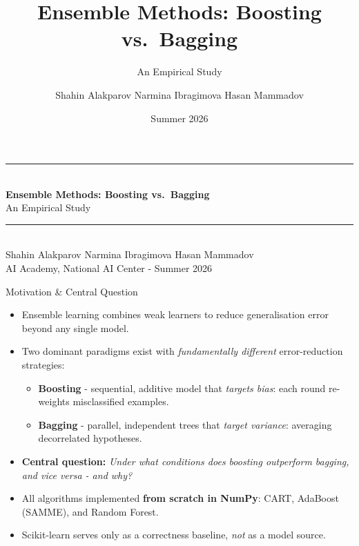 \documentclass[aspectratio=169,10pt]{beamer}
\title{\color{lectureblue}Ensemble Methods: Boosting vs.\ Bagging}
\subtitle{An Empirical Study}
\author{Shahin Alakparov \quad Narmina Ibragimova \quad Hasan Mammadov}
\institute{AI Academy, National AI Center}
\date{Summer 2026}
\begin{document}
\begin{frame}[plain]
  \vspace{1.2cm}
  \centering
  {\color{lectureblue}\rule{0.9\linewidth}{1.2pt}}\\[10pt]
  {\LARGE\bfseries\color{lectureblue} Ensemble Methods: Boosting vs.\ Bagging}\\[4pt]
  {\large An Empirical Study}\\[10pt]
  {\color{lectureblue}\rule{0.9\linewidth}{1.2pt}}\\[18pt]
  {\normalsize Shahin Alakparov \quad Narmina Ibragimova \quad Hasan Mammadov}\\[4pt]
  {\small AI Academy, National AI Center - Summer 2026}
\end{frame}

\begin{frame}{Motivation \& Central Question}
  \begin{itemize}
    \item Ensemble learning combines weak learners to reduce generalisation error beyond any single model.
    \item Two dominant paradigms exist with \emph{fundamentally different} error-reduction strategies:
      \begin{itemize}
        \item \textbf{Boosting} - sequential, additive model that \emph{targets bias}: each round re-weights misclassified examples.
        \item \textbf{Bagging} - parallel, independent trees that \emph{target variance}: averaging decorrelated hypotheses.
      \end{itemize}
    \item[] {\color{lectureblue}\textbf{Central question:}} \textit{Under what conditions does boosting outperform bagging, and vice versa - and \emph{why}?}
    \item All algorithms implemented \textbf{from scratch in NumPy}: CART, AdaBoost (SAMME), and Random Forest.
    \item Scikit-learn serves only as a correctness baseline, \emph{not} as a model source.
  \end{itemize}
\end{frame}
\end{document}
